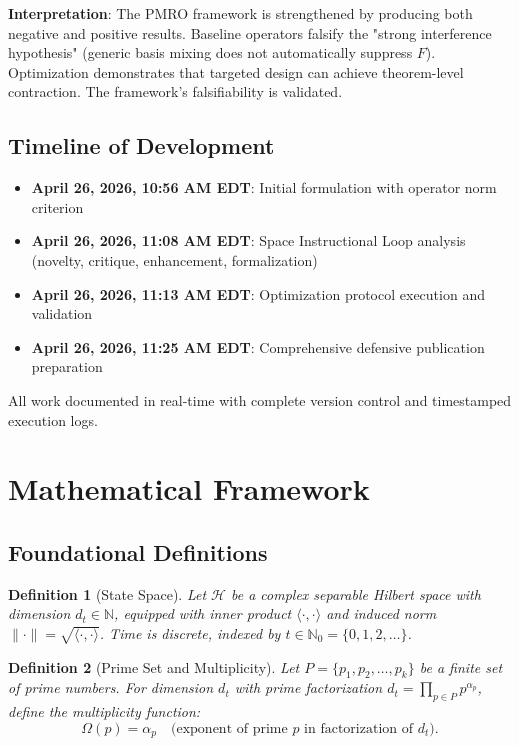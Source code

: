 \documentclass[11pt,a4paper]{article}
\newtheorem{definition}{Definition}
\begin{document}
\textbf{Interpretation}: The PMRO framework is strengthened by producing both negative and positive results. Baseline operators falsify the "strong interference hypothesis" (generic basis mixing does not automatically suppress \(F\)). Optimization demonstrates that targeted design can achieve theorem-level contraction. The framework's falsifiability is validated.

\subsection{Timeline of Development}

\begin{itemize}
\item \textbf{April 26, 2026, 10:56 AM EDT}: Initial formulation with operator norm criterion
\item \textbf{April 26, 2026, 11:08 AM EDT}: Space Instructional Loop analysis (novelty, critique, enhancement, formalization)
\item \textbf{April 26, 2026, 11:13 AM EDT}: Optimization protocol execution and validation
\item \textbf{April 26, 2026, 11:25 AM EDT}: Comprehensive defensive publication preparation
\end{itemize}

All work documented in real-time with complete version control and timestamped execution logs.

\section{Mathematical Framework}

\subsection{Foundational Definitions}

\begin{definition}[State Space]
Let \(\mathcal{H}\) be a complex separable Hilbert space with dimension \(d_t \in \mathbb{N}\), equipped with inner product \(\langle \cdot, \cdot \rangle\) and induced norm \(\|\cdot\| = \sqrt{\langle \cdot, \cdot \rangle}\). Time is discrete, indexed by \(t \in \mathbb{N}_0 = \{0, 1, 2, \ldots\}\).
\end{definition}

\begin{definition}[Prime Set and Multiplicity]
Let \(P = \{p_1, p_2, \ldots, p_k\}\) be a finite set of prime numbers. For dimension \(d_t\) with prime factorization \(d_t = \prod_{p \in P} p^{\alpha_p}\), define the multiplicity function:
\[
\Omega(p) = \alpha_p \quad \text{(exponent of prime \(p\) in factorization of \(d_t\))}.
\]
\end{definition}
\end{document}
